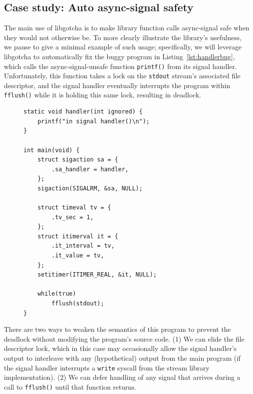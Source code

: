 \subsection{Case study: Auto async-signal safety}
\label{sec:statefulness}

The main use of libgotcha is to make library function calls async-signal safe when
they would not otherwise be.  To more clearly illustrate the library's usefulness, we
pause to give a minimal example of such usage; specifically, we will leverage
libgotcha to automatically fix the buggy program in Listing~\ref{lst:handlerbug},
which calls the async-signal-unsafe function \texttt{printf()} from its signal
handler.  Unfortunately, this function takes a lock on the \texttt{stdout} stream's
associated file descriptor, and the signal handler eventually interrupts the program
within \texttt{fflush()} while it is holding this same lock, resulting in deadlock.

\begin{figure}
\begin{lstlisting}[label=lst:handlerbug,caption=C program with a buggy signal handler]
static void handler(int ignored) {
	printf("in signal handler()\n");
}

int main(void) {
	struct sigaction sa = {
		.sa_handler = handler,
	};
	sigaction(SIGALRM, &sa, NULL);

	struct timeval tv = {
		.tv_sec = 1,
	};
	struct itimerval it = {
		.it_interval = tv,
		.it_value = tv,
	};
	setitimer(ITIMER_REAL, &it, NULL);

	while(true)
		fflush(stdout);
}
\end{lstlisting}
\end{figure}

There are two ways to weaken the semantics of this program to prevent the deadlock
without modifying the program's source code.  (1) We can elide the file descriptor
lock, which in this case may occasionally allow the signal handler's output to
interleave with any (hypothetical) output from the main program (if the signal
handler interrupts a \texttt{write} syscall from the stream library implementation).
(2) We can defer handling of any signal that arrives during a call to
\texttt{fflush()} until that function returns.

